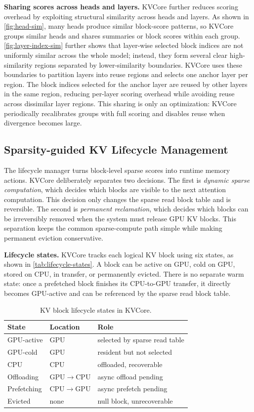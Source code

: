 \documentclass[sigplan,10pt,review,anonymous]{acmart}
\begin{document}
\noindent\textbf{Sharing scores across heads and layers.}
KVCore further reduces scoring overhead by exploiting structural similarity across heads and layers.
As shown in \autoref{fig:head-sim}, many heads produce similar block-score patterns, so KVCore groups similar heads and shares summaries or block scores within each group.
\autoref{fig:layer-index-sim} further shows that layer-wise selected block indices are not uniformly similar across the whole model; instead, they form several clear high-similarity regions separated by lower-similarity boundaries.
KVCore uses these boundaries to partition layers into reuse regions and selects one anchor layer per region.
The block indices selected for the anchor layer are reused by other layers in the same region, reducing per-layer scoring overhead while avoiding reuse across dissimilar layer regions.
This sharing is only an optimization: KVCore periodically recalibrates groups with full scoring and disables reuse when divergence becomes large.

\subsection{Sparsity-guided KV Lifecycle Management}

The lifecycle manager turns block-level sparse scores into runtime memory actions.
KVCore deliberately separates two decisions.
The first is \emph{dynamic sparse computation}, which decides which blocks are visible to the next attention computation.
This decision only changes the sparse read block table and is reversible.
The second is \emph{permanent reclamation}, which decides which blocks can be irreversibly removed when the system must release GPU KV blocks.
This separation keeps the common sparse-compute path simple while making permanent eviction conservative.

\noindent\textbf{Lifecycle states.}
KVCore tracks each logical KV block using six states, as shown in \autoref{tab:lifecycle-states}.
A block can be active on GPU, cold on GPU, stored on CPU, in transfer, or permanently evicted.
There is no separate warm state: once a prefetched block finishes its CPU-to-GPU transfer, it directly becomes GPU-active and can be referenced by the sparse read block table.

\begin{table}[t]
\centering
\small
\caption{KV block lifecycle states in KVCore.}
\label{tab:lifecycle-states}
\begin{tabular}{lll}
\toprule
State & Location & Role \\
\midrule
GPU-active & GPU & selected by sparse read table \\
GPU-cold & GPU & resident but not selected \\
CPU & CPU & offloaded, recoverable \\
Offloading & GPU$\rightarrow$CPU & async offload pending \\
Prefetching & CPU$\rightarrow$GPU & async prefetch pending \\
Evicted & none & null block, unrecoverable \\
\bottomrule
\end{tabular}
\end{table}
\end{document}
